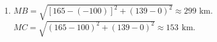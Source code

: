 \begin{vd}
{\begin{enumerate}
\begin{itemize}
        $$\left\{\begin{aligned} 
        & \dfrac {x^2}{5 3 2 9} - \dfrac{y^2}{ 4 6 7 1 } = 1  \\
        & \dfrac {x^2}{ 2 1 3 1 6} - \dfrac {y^2}{6 8 6 8 4}= 1
        \end{aligned}\right.
        \Rightarrow \left\{\begin{aligned}  
        &{ x ^ { 2 } = \dfrac { 3 4 1 1 2 5 2 7 7 } { 1 2 5 0 0 } } \\
        &{ y ^ { 2 } = \dfrac { 2 4 0 6 1 7 2 2 3 } { 1 2 5 0 0 } }
    \end{aligned}\right.   \Rightarrow \left\{\begin{aligned}
        &x \approx 165 \\
        &y \approx 139.
    \end{aligned}\right.$$
        (vì theo hình vẽ $x, y>0$ )
    \end{itemize} 
    \item  $M B=\sqrt{[165-(-100)]^2+(139-0)^2} \approx 299$ km. \\
    $M C=\sqrt{(165-100)^2+(139-0)^2} \approx 153\,\mathrm{~km}$.
\end{enumerate}
    
    }
\end{vd}

